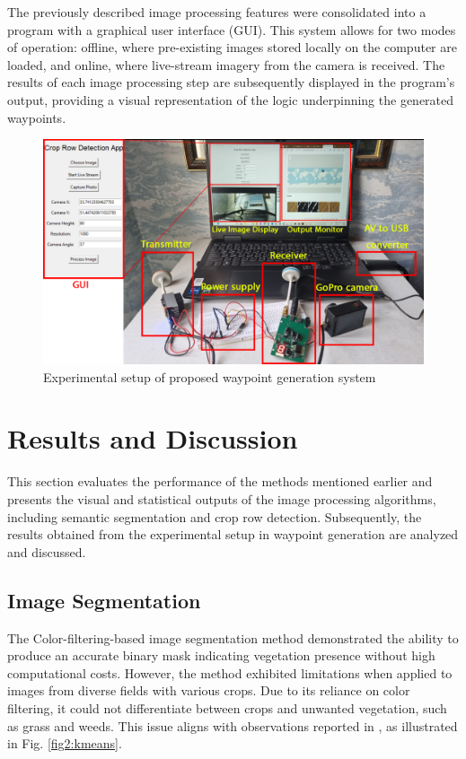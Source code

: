 \documentclass[conference]{IEEEtran}
\begin{document}
	The previously described image processing features were consolidated into a program with a graphical user interface (GUI). This system allows for two modes of operation: offline, where pre-existing images stored locally on the computer are loaded, and online, where live-stream imagery from the camera is received. The results of each image processing step are subsequently displayed in the program's output, providing a visual representation of the logic underpinning the generated waypoints.
	
	
	
	
	\begin{figure}[t]
		\includegraphics[width=\linewidth]{Setup of experiment.png}
		\caption{Experimental setup of proposed waypoint generation system}
		\label{EXP}
	\end{figure}
	
	\section{Results and Discussion}\label{Results and Discussion}
	
	This section evaluates the performance of the methods mentioned earlier and presents the visual and statistical outputs of the image processing algorithms, including semantic segmentation and crop row detection. Subsequently, the results obtained from the experimental setup in waypoint generation are analyzed and discussed.
	\subsection{Image Segmentation}
	
	The Color-filtering-based image segmentation method demonstrated the ability to produce an accurate binary mask indicating vegetation presence without high computational costs. However, the method exhibited limitations when applied to images from diverse fields with various crops. Due to its reliance on color filtering, it could not differentiate between crops and unwanted vegetation, such as grass and weeds. This issue aligns with observations reported in \cite{b5}, as illustrated in Fig.
	\ref{fig2:kmeans}.
	
\end{document}
